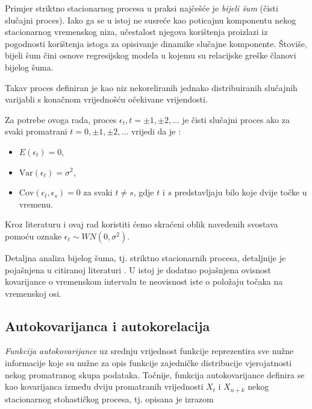 \documentclass[a4paper,12pt,oneside]{memoir}
\begin{document}
            Primjer striktno stacionarnog procesa u praksi najčešće je \textit{bijeli šum} (čisti slučajni proces). Iako ga se u istoj ne susreće kao poticajnu komponentu nekog stacionarnog vremenskog niza, učestalost njegova korištenja proizlazi iz pogodnosti korištenja istoga za opisivanje dinamike slučajne komponente. Štoviše, bijeli šum čini osnove regresijskog modela u kojemu su relacijske greške članovi bijelog šuma.
            
            Takav proces definiran je kao niz nekoreliranih jednako distribuiranih slučajnih varijabli s konačnom vrijednošću očekivane vrijendosti.

            Za potrebe ovoga rada, proces ${\epsilon_t, t=\pm 1, \pm 2, \ldots}$ je čisti slučajni proces ako za svaki promatrani $t=0,\pm 1, \pm 2,\ldots$ vrijedi da je \cite{Bahovec}:

            \begin{itemize}
                \item $E(\epsilon_t)=0$,
                \item $\mathrm{Var}(\epsilon_t)=\sigma^2$,
                \item $\mathrm{Cov}(\epsilon_t,\epsilon_s)=0$ za svaki $t\neq s$, gdje $t$ i $s$ predstavljaju bilo koje dvije točke u vremenu.
            \end{itemize}

            Kroz literaturu i ovaj rad koristiti ćemo skraćeni oblik navedenih svostava pomoću oznake $\epsilon_t\sim WN(0,\sigma^2)$.

            Detaljna analiza bijelog šuma, tj. striktno stacionarnih procesa, detaljnije je pojašnjena u citiranoj literaturi \cite{Priestley}\cite{Bahovec}. U istoj je dodatno pojašnjena ovisnost kovarijance o vremenskom intervalu te neovisnost iste o položaju točaka na vremenskoj osi.

            \subsection{Autokovarijanca i autokorelacija}

            \textit{Funkcija autokovarijance} uz srednju vrijednost funkcije reprezentira sve nužne informacije koje su nužne za opis funkcije zajedničke distribucije vjerojatnosti nekog promatranog skupa podataka. Točnije, funkcija autokovarijance definira se kao kovarijanca između dviju promatranih vrijednosti $X_t$ i $X_{n+k}$ nekog stacionarnog stohastičkog procesa, tj. opisana je izrazom
\end{document}
